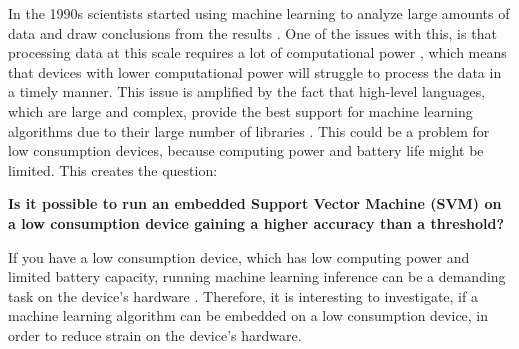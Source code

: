 In the 1990s scientists started using machine learning to analyze large amounts of data and draw conclusions from the results \cite{marr2016short}.
One of the issues with this, is that processing data at this scale requires a lot of computational power \cite{garcia2019estimation}, which means that devices with lower computational power will struggle to process the data in a timely manner.
This issue is amplified by the fact that high-level languages, which are large and complex, provide the best support for machine learning algorithms due to their large number of libraries \cite{top5mllangs}.
This could be a problem for low consumption devices, because computing power and battery life might be limited. This creates the question: 
\begin{center}
\textbf{Is it possible to run an embedded Support Vector Machine (SVM) on a low consumption device gaining a higher accuracy than a threshold?}
\end{center}
If you have a low consumption device, which has low computing power and limited battery capacity, running machine learning inference can be a demanding task on the device's hardware \cite{batterylifewearablesensors}. Therefore, it is interesting to investigate, if a machine learning algorithm can be embedded on a low consumption device, in order to reduce strain on the device's hardware.\\



